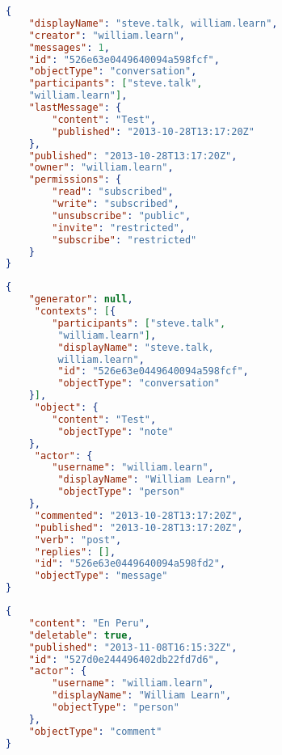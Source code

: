 \begin{lstlisting}[caption=ObjectType conversation, label=objectType_conversation, language=json]
 {
    "displayName": "steve.talk, william.learn",
    "creator": "william.learn",
    "messages": 1,
    "id": "526e63e0449640094a598fcf",
    "objectType": "conversation",
    "participants": ["steve.talk",
    "william.learn"],
    "lastMessage": {
        "content": "Test",
        "published": "2013-10-28T13:17:20Z"
    },
    "published": "2013-10-28T13:17:20Z",
    "owner": "william.learn",
    "permissions": {
        "read": "subscribed",
        "write": "subscribed",
        "unsubscribe": "public",
        "invite": "restricted",
        "subscribe": "restricted"
    }
}
\end{lstlisting}

\begin{lstlisting}[caption=ObjectType message, label=objectType_message, language=json]
{
	"generator": null,
	 "contexts": [{
		"participants": ["steve.talk",
		 "william.learn"],
		 "displayName": "steve.talk,
		 william.learn",
		 "id": "526e63e0449640094a598fcf",
		 "objectType": "conversation"
	}],
	 "object": {
		"content": "Test",
		 "objectType": "note"
	},
	 "actor": {
		"username": "william.learn",
		 "displayName": "William Learn",
		 "objectType": "person"
	},
	 "commented": "2013-10-28T13:17:20Z",
	 "published": "2013-10-28T13:17:20Z",
	 "verb": "post",
	 "replies": [],
	 "id": "526e63e0449640094a598fd2",
	 "objectType": "message"
}
\end{lstlisting}

\begin{lstlisting}[caption=ObjectType comment, label=objectType_comment, language=json]
{
    "content": "En Peru",
    "deletable": true,
    "published": "2013-11-08T16:15:32Z",
    "id": "527d0e244496402db22fd7d6",
    "actor": {
        "username": "william.learn",
        "displayName": "William Learn",
        "objectType": "person"
    },
    "objectType": "comment"
}
\end{lstlisting}

